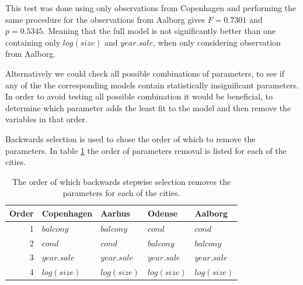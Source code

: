 This test was done using only observations from Copenhagen and performing the same procedure for the observations from Aalborg gives $F=0.7301$ and $p=0.5345$.
Meaning that the full model is not significantly better than one containing only $log(size)$ and $year.sale$, when only considering observation from Aalborg.

Alternatively we could check all possible combinations of parameters, to see if any of the the corresponding models contain statistically insignificant parameters.
In order to avoid testing all possible combination it would be beneficial, to determine which parameter adds the least fit to the model and then remove the variables in that order. 


\newpage
Backwards selection is used to chose the order of which to remove the parameters.
In table \ref{tbl:backward_order_of_parameters} the order of parameters removal is listed for each of the cities.
    
\begin{table}[H]
    \centering
    \begin{tabular}{r|llll}
        \toprule
        \textbf{Order} & \textbf{Copenhagen} & \textbf{Aarhus} & \textbf{Odense} & \textbf{Aalborg}\\
        \midrule
        1 & $balcony$              & $balcony$         & $cond$            & $cond$ \\
        2 & $cond$           & $cond$            & $balcony$         & $balcony$ \\
        3 & $year.sale$    & $year.sale$  & $year.sale$  & $year.sale$ \\
        4 & $log(size)$         & $log(size)$       & $log(size)$       & $log(size)$ \\
        \bottomrule
    \end{tabular}
    \caption{The order of which backwards stepwise selection removes the parameters for each of the cities.}
    \label{tbl:backward_order_of_parameters}
\end{table}

